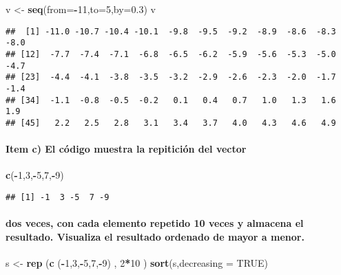 \documentclass[]{article}
\newenvironment{Shaded}{\begin{snugshade}}{\end{snugshade}}
\newcommand{\KeywordTok}[1]{\textcolor[rgb]{0.13,0.29,0.53}{\textbf{#1}}}
\newcommand{\DataTypeTok}[1]{\textcolor[rgb]{0.13,0.29,0.53}{#1}}
\newcommand{\DecValTok}[1]{\textcolor[rgb]{0.00,0.00,0.81}{#1}}
\newcommand{\FloatTok}[1]{\textcolor[rgb]{0.00,0.00,0.81}{#1}}
\newcommand{\StringTok}[1]{\textcolor[rgb]{0.31,0.60,0.02}{#1}}
\newcommand{\OtherTok}[1]{\textcolor[rgb]{0.56,0.35,0.01}{#1}}
\newcommand{\OperatorTok}[1]{\textcolor[rgb]{0.81,0.36,0.00}{\textbf{#1}}}
\newcommand{\NormalTok}[1]{#1}
\let\oldparagraph\paragraph
\renewcommand{\paragraph}[1]{\oldparagraph{#1}\mbox{}}
\begin{document}
\begin{Shaded}
\begin{Highlighting}[]
\NormalTok{v <-}\StringTok{ }\KeywordTok{seq}\NormalTok{(}\DataTypeTok{from=}\OperatorTok{-}\DecValTok{11}\NormalTok{,}\DataTypeTok{to=}\DecValTok{5}\NormalTok{,}\DataTypeTok{by=}\FloatTok{0.3}\NormalTok{)}
\NormalTok{v}
\end{Highlighting}
\end{Shaded}

\begin{verbatim}
##  [1] -11.0 -10.7 -10.4 -10.1  -9.8  -9.5  -9.2  -8.9  -8.6  -8.3  -8.0
## [12]  -7.7  -7.4  -7.1  -6.8  -6.5  -6.2  -5.9  -5.6  -5.3  -5.0  -4.7
## [23]  -4.4  -4.1  -3.8  -3.5  -3.2  -2.9  -2.6  -2.3  -2.0  -1.7  -1.4
## [34]  -1.1  -0.8  -0.5  -0.2   0.1   0.4   0.7   1.0   1.3   1.6   1.9
## [45]   2.2   2.5   2.8   3.1   3.4   3.7   4.0   4.3   4.6   4.9
\end{verbatim}

\paragraph{Item c) El código muestra la repitición del
vector}\label{item-c-el-codigo-muestra-la-repiticion-del-vector}

\begin{Shaded}
\begin{Highlighting}[]
\KeywordTok{c}\NormalTok{(}\OperatorTok{-}\DecValTok{1}\NormalTok{,}\DecValTok{3}\NormalTok{,}\OperatorTok{-}\DecValTok{5}\NormalTok{,}\DecValTok{7}\NormalTok{,}\OperatorTok{-}\DecValTok{9}\NormalTok{)}
\end{Highlighting}
\end{Shaded}

\begin{verbatim}
## [1] -1  3 -5  7 -9
\end{verbatim}

\paragraph{dos veces, con cada elemento repetido 10 veces y almacena el
resultado. Visualiza el resultado ordenado de mayor a
menor.}\label{dos-veces-con-cada-elemento-repetido-10-veces-y-almacena-el-resultado.-visualiza-el-resultado-ordenado-de-mayor-a-menor.}

\begin{Shaded}
\begin{Highlighting}[]
\NormalTok{s <-}\StringTok{ }\KeywordTok{rep}\NormalTok{ (}\KeywordTok{c}\NormalTok{ (}\OperatorTok{-}\DecValTok{1}\NormalTok{,}\DecValTok{3}\NormalTok{,}\OperatorTok{-}\DecValTok{5}\NormalTok{,}\DecValTok{7}\NormalTok{,}\OperatorTok{-}\DecValTok{9}\NormalTok{) , }\DecValTok{2}\OperatorTok{*}\DecValTok{10}\NormalTok{ )}
\KeywordTok{sort}\NormalTok{(s,}\DataTypeTok{decreasing =} \OtherTok{TRUE}\NormalTok{)}
\end{Highlighting}
\end{Shaded}
\end{document}
